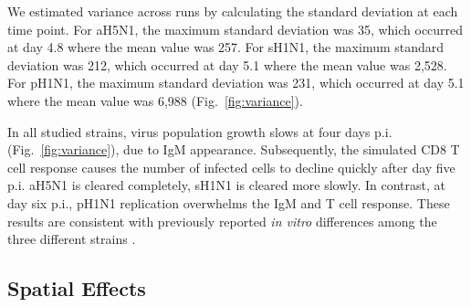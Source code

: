 \documentclass[preprint,10pt,numbers]{elsarticle}
\begin{document}

We estimated variance across runs by calculating the standard deviation at each time point.  For aH5N1, the maximum standard deviation was 35, which occurred at day 4.8 where the mean value was 257.  For sH1N1, the maximum standard deviation was 212, which occurred at day 5.1 where the mean value was 2,528.  For pH1N1, the maximum standard deviation was 231, which occurred at day 5.1 where the mean value was 6,988 (Fig.~\ref{fig:variance}).

In all studied strains, virus population growth slows at four days p.i. (Fig.~\ref{fig:variance}), due to IgM appearance.  Subsequently, the simulated CD8 T cell response causes the number of infected cells to decline quickly after day five p.i.  aH5N1 is cleared completely, sH1N1 is cleared more slowly.  In contrast, at day six p.i., pH1N1 replication overwhelms the IgM and T cell response.  These results are consistent with previously reported \textit{in vitro} differences among the three different strains \citep{Mitchell2011}.



\subsection*{Spatial Effects}

\end{document}

